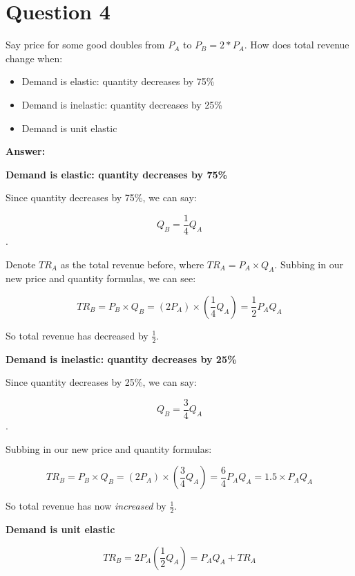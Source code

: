 \documentclass[12pt]{article}
\begin{document}
\vspace{2mm}


\section*{Question 4}
Say price for some good doubles from $P_A$ to $P_B = 2*P_A$. How does total revenue change when:
    \begin{itemize}
        \item Demand is elastic: quantity decreases by 75\%
        \item Demand is inelastic: quantity decreases by 25\%
        \item Demand is unit elastic
    \end{itemize}

    \textbf{Answer:}

\vspace{2mm}

\textbf{Demand is elastic: quantity decreases by 75\%}

\vspace{2mm}

Since quantity decreases by 75\%, we can say:

$$Q_B = \dfrac{1}{4} Q_A$$.

Denote $TR_A$ as the total revenue before, where $TR_A = P_A \times Q_A$. Subbing in our new price and quantity formulas, we can see:

$$ TR_B = P_B \times Q_B = (2P_A) \times (\dfrac{1}{4} Q_A) = \dfrac{1}{2} P_A Q_A $$

So total revenue has decreased by $\frac{1}{2}$.

\vspace{2mm}

\textbf{Demand is inelastic: quantity decreases by 25\%}

Since quantity decreases by 25\%, we can say:

$$Q_B = \dfrac{3}{4} Q_A$$.

Subbing in our new price and quantity formulas:

$$ TR_B = P_B \times Q_B = (2P_A) \times (\dfrac{3}{4} Q_A) = \dfrac{6}{4} P_A Q_A = 1.5 \times P_A Q_A $$

So total revenue has now \textit{increased} by $\frac{1}{2}$.

\vspace{2mm}

\textbf{Demand is unit elastic}

$$ TR_B = 2 P_A (\frac{1}{2}Q_A) = P_A Q_A + TR_A $$
\end{document}
